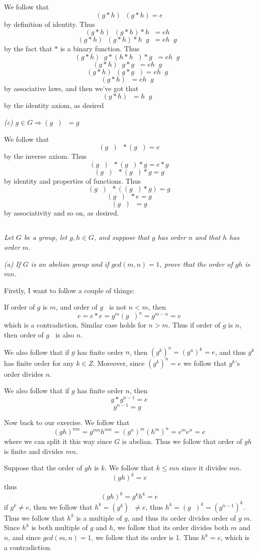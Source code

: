 \documentclass[11pt,oneside,titlepage]{book}
\DeclareMathOperator \inv {^{-1}}
\DeclareMathOperator \ra {\Rightarrow}
\begin{document}
We follow that
$$(g * h)\inv  (g * h) = e$$
by definition of identity. Thus
$$(g * h)\inv  (g * h) * h\inv  = e h\inv$$
$$(g * h)\inv  (g * h) * h\inv  g\inv  = e h\inv g\inv$$
by the fact that $*$ is a binary function. Thus
$$(g * h)\inv  g * (h * h\inv) * g\inv  = e h\inv g\inv$$
$$(g * h)\inv  g * g\inv  = e h\inv g\inv$$
$$(g * h)\inv  (g * g\inv)  = e h\inv g\inv$$
$$(g * h)\inv = e h\inv g\inv$$
by associative laws, and then we've got that
$$(g * h)\inv = h\inv g\inv$$
by the identity axiom, as desired

\textit{(c) $g \in G \ra (g\inv) \inv = g$}

We follow that
$$(g\inv) \inv * (g\inv) = e$$
by the inverse axiom. Thus
$$(g\inv)\inv * (g\inv) * g  = e * g$$
$$(g\inv)\inv * (g\inv) * g  = g$$
by identity and properties of functions. Thus
$$(g\inv)\inv * ((g\inv) * g)  = g$$
$$(g\inv)\inv * e  = g$$
$$(g\inv)\inv  = g$$
by associativity and so on, as desired.

\subsection{}

\textit{Let $G$ be a group, let $g, h \in G$, and suppose that $g$ has
  order $n$ and that $h$ has order $m$.}

\textit{(a) If $G$ is an abelian group and if $gcd(m, n) = 1$, prove that
  the order of $gh$ is $mn$.}

Firstly, I want to follow a couple of things:

If order of $g$ is $m$, and order of $g\inv$ is not $n < m$, then
$$e = e * e = g^m (g\inv)^n = g^{m - n} = e$$
which is a contradiction. Similar case holds for $n > m$.  Thus if
order of $g$ is $n$, then order of $g\inv$ is also $n$.

We also follow that if $g$ has finite order $n$, then $(g^k)^n =
(g^n)^k = e$, and thus $g^k$ has finite order for any $k \in Z$.
Moreover, since $(g^k)^n = e$ we follow that $g^k$'s order divides $n$.

We also follow that if $g$ has finite order $n$, then
$$g * g^{n - 1} = e$$
$$g^{n - 1} = g\inv$$


Now back to our exercise. We follow that
$$(gh)^{mn} = g^{mn} h^{mn} = (g^{n})^m (h^m)^n = e^m e^n = e$$
where we can split it this way since $G$ is abelian. Thus we follow
that order of $gh$ is finite and divides $mn$.

Suppose that the order of $gh$ is $k$. We follow that $k \leq mn$
since it divides $mn$.
$$(gh)^k = e$$
thus
$$(gh)^k = g^k h^k = e$$
if $g^k \neq e$, then we follow that $h^k = (g^k) \inv \neq e$, thus
$h^k = (g\inv)^k = (g^{n - 1})^k$. Thus we follow that $h^k$ is a
multiple of $g$, and thus its order divides order of $g$ $m$. Since
$h^k$ is both multiple of $g$ and $h$, we follow that its order
divides both $m$ and $n$, and since $gcd(m, n) = 1$, we follow that
its order is 1. Thus $h^k = e$, which is a contradiction.
\end{document}
